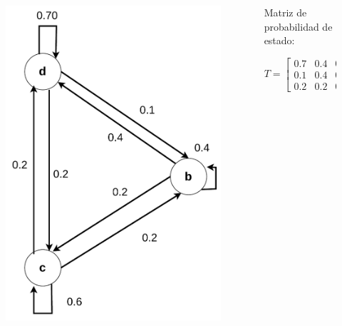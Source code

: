 \documentclass[11pt]{beamer}
\begin{document}
\begin{frame}
	\begin{columns}
		\begin{column}{0.5\textwidth}
			\vspace{-0.5cm}
			\begin{figure}
				\includegraphics[scale=0.5]{images/markov_cuatro.pdf}
			\end{figure}
		\end{column}
		\begin{column}{0.5\textwidth}
			Matriz de probabilidad de estado:
			
			\begin{equation*}
			T = \begin{bmatrix}
			0.7 & 0.4 & 0.2\\
			0.1 & 0.4 & 0.2\\
			0.2 & 0.2 & 0.6
			\end{bmatrix}
			\end{equation*}


\end{column}
\end{columns}
\end{frame}
\end{document}
